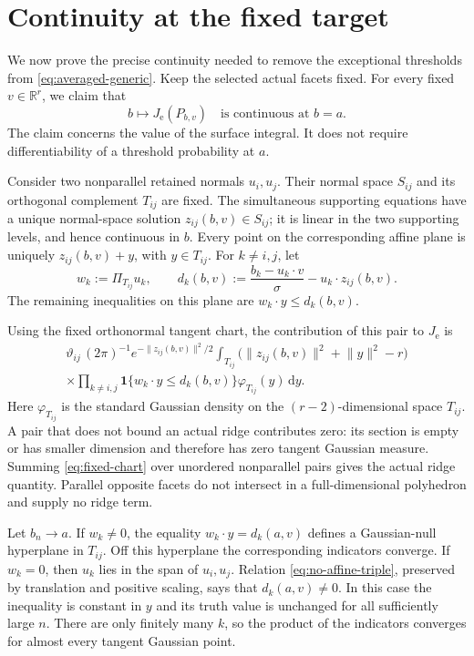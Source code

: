 \documentclass[11pt]{article}
\newcommand{\R}{\mathbb R}
\newcommand{\ind}{\mathbf 1}
\newcommand{\dd}{\,\mathrm d}
\newcommand{\norm}[1]{\lVert #1\rVert}
\newcommand{\Je}{J_{\mathrm e}}
\begin{document}
\section{Continuity at the fixed target}

We now prove the precise continuity needed to remove the exceptional
thresholds from \eqref{eq:averaged-generic}. Keep the selected actual
facets fixed. For every fixed $v\in\R^r$, we claim that
\begin{equation}\label{eq:continuity}
 b\longmapsto\Je(P_{b,v})
 \quad\text{is continuous at }b=a.
\end{equation}
The claim concerns the value of the surface integral. It does not
require differentiability of a threshold probability at $a$.

Consider two nonparallel retained normals $u_i,u_j$. Their normal
space $S_{ij}$ and its orthogonal complement $T_{ij}$ are fixed.
The simultaneous supporting equations have a unique normal-space
solution $z_{ij}(b,v)\in S_{ij}$; it is linear in the two supporting
levels, and hence continuous in $b$. Every point on the corresponding
affine plane is uniquely $z_{ij}(b,v)+y$, with $y\in T_{ij}$.
For $k\ne i,j$, let
\[
 w_k:=\Pi_{T_{ij}}u_k,\qquad
 d_k(b,v):=\frac{b_k-u_k\cdot v}{\sigma}
                         -u_k\cdot z_{ij}(b,v).
\]
The remaining inequalities on this plane are $w_k\cdot y\le d_k(b,v)$.

Using the fixed orthonormal tangent chart, the contribution of this
pair to $\Je$ is
\begin{multline}\label{eq:fixed-chart}
 \vartheta_{ij}\,(2\pi)^{-1}e^{-\norm{z_{ij}(b,v)}^2/2}
 \int_{T_{ij}}
   \bigl(\norm{z_{ij}(b,v)}^2+\norm y^2-r\bigr)\\[-3pt]
 \times\prod_{k\ne i,j}\ind\{w_k\cdot y\le d_k(b,v)\}
          \varphi_{T_{ij}}(y)\dd y.
\end{multline}
Here $\varphi_{T_{ij}}$ is the standard Gaussian density on the
$(r-2)$-dimensional space $T_{ij}$. A pair that does not bound an
actual ridge contributes zero: its section is empty or has smaller
dimension and therefore has zero tangent Gaussian measure. Summing
\eqref{eq:fixed-chart} over unordered nonparallel pairs gives the
actual ridge quantity. Parallel opposite facets do not intersect in a
full-dimensional polyhedron and supply no ridge term.

Let $b_n\to a$. If $w_k\ne0$, the equality
$w_k\cdot y=d_k(a,v)$ defines a Gaussian-null hyperplane in
$T_{ij}$. Off this hyperplane the corresponding indicators converge.
If $w_k=0$, then $u_k$ lies in the span of $u_i,u_j$. Relation
\eqref{eq:no-affine-triple}, preserved by translation and positive
scaling, says that $d_k(a,v)\ne0$. In this case the inequality is
constant in $y$ and its truth value is unchanged for all sufficiently
large $n$. There are only finitely many $k$, so the product of the
indicators converges for almost every tangent Gaussian point.
\end{document}
